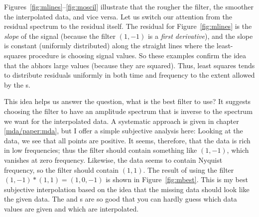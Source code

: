 \par
Figures~\ref{fig:mlines}--\ref{fig:moscil}
illustrate that the rougher the filter,
the smoother the interpolated data,
and vice versa.
Let us switch our attention from the residual spectrum
to the residual itself.
The residual for Figure~\ref{fig:mlines}
is the {\it slope} of the signal
(because the filter $(1,-1)$ is a {\it first derivative}),
and the slope is constant (uniformly distributed) along the straight lines
where the least-squares procedure is choosing signal values.
So these examples confirm the idea
that the  abhors large values
(because they are squared).
Thus, least squares tends to distribute residuals uniformly
in both time and frequency to the extent
allowed by the s.
\par
This idea helps us answer the question,
what is the best filter to use?
It suggests choosing
the filter to have an amplitude spectrum
that is inverse to the spectrum we want for the interpolated data.
A systematic approach is given in chapter \ref{mda/paper:mda},
but I offer a simple subjective analysis here:
Looking at the data, we see that all points are positive.
It seems, therefore, that
the data is rich in low frequencies;
thus the filter should contain something like $(1,-1)$,
which vanishes at zero frequency.
Likewise, the data seems to contain Nyquist frequency,
so the filter should contain $(1,1)$.
The result of using the filter $(1,-1)\ast (1,1)=(1,0,-1)$
is shown in Figure~\ref{fig:mbest}.
This is my best subjective interpolation
based on the idea that the missing data should look like the given data.
The  and s are so good that
you can hardly guess which data values are given
and which are interpolated.

